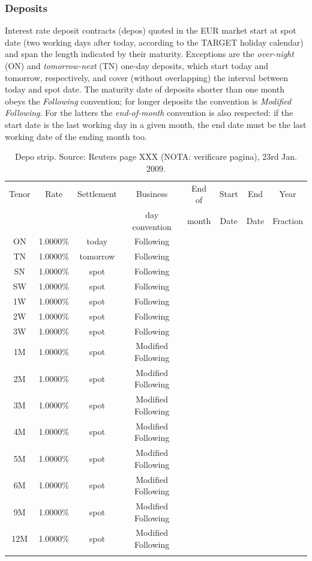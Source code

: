 \documentclass[11pt,reqno]{amsart}
\begin{document}
\subsubsection{\label{SecDepo}Deposits}
Interest rate deposit contracts (depos) quoted in the EUR market start at spot date (two working days after today, according to the TARGET holiday calendar) and span the length indicated by their maturity. Exceptions are the {\it over-night} (ON) and {\it tomorrow-next} (TN) one-day deposits, which start today and tomorrow, respectively, and cover (without overlapping) the interval between today and spot date.
The maturity date of deposits shorter than one month obeys the {\it Following} convention; for longer deposits the convention is {\it Modified Following}. For the latters the {\it end-of-month} convention is also respected: if the start date is the last working day in a given month, the end date must be the last working date of the ending month too.
\begin{table}[btp]
\label{tab:deposits}
\begin{tabular}{cccccccc}
Tenor & Rate & Settlement & Business       & End of & Start & End  & Year \\
      &      &            & day convention & month   & Date  & Date & Fraction \\
ON & 1.0000\% & today & Following &  &  \\
TN & 1.0000\% & tomorrow & Following &  &  \\
SN & 1.0000\% & spot & Following &  &  \\
SW & 1.0000\% & spot & Following &  &  \\
1W & 1.0000\% & spot & Following &  &  \\
2W & 1.0000\% & spot & Following &  &  \\
3W & 1.0000\% & spot & Following &  &  \\
1M & 1.0000\% & spot & Modified Following &  &  \\
2M & 1.0000\% & spot & Modified Following &  &  \\
3M & 1.0000\% & spot & Modified Following &  &  \\
4M & 1.0000\% & spot & Modified Following &  &  \\
5M & 1.0000\% & spot & Modified Following &  &  \\
6M & 1.0000\% & spot & Modified Following &  &  \\
9M & 1.0000\% & spot & Modified Following &  &  \\
12M & 1.0000\% & spot & Modified Following &  &  \\
&  &  &  &  &
\end{tabular}%
\caption{Depo strip. Source: Reuters page XXX (NOTA: verificare pagina), 23rd Jan. 2009.}
\end{table}
\end{document}
